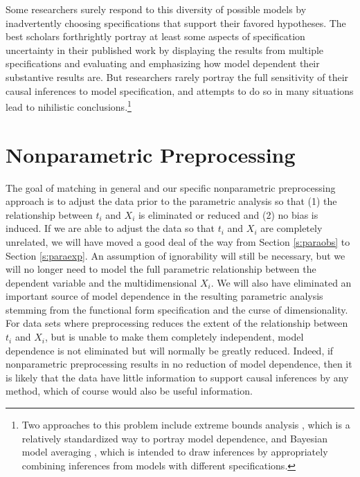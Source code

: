 \documentclass[11pt,titlepage]{article}
\begin{document}
Some researchers surely respond to this diversity of possible models
by inadvertently choosing specifications that support their favored
hypotheses.  The best scholars forthrightly portray at least some
aspects of specification uncertainty in their published work by
displaying the results from multiple specifications and evaluating and
emphasizing how model dependent their substantive results are.  But
researchers rarely portray the full sensitivity of their causal
inferences to model specification, and attempts to do so in many
situations lead to nihilistic conclusions.\footnote{Two approaches to
  this problem include extreme bounds analysis \citep{Leamer78}, which
  is a relatively standardized way to portray model dependence, and
  Bayesian model averaging \citep{HoeMadRaf99,ImaKin04}, which is
  intended to draw inferences by appropriately combining inferences
  from models with different specifications.}

\section{Nonparametric Preprocessing} \label{s:nonparpreproc}

The goal of matching in general and our specific nonparametric
preprocessing approach is to adjust the data prior to the parametric
analysis so that (1) the relationship between $t_i$ and $X_i$ is
eliminated or reduced and (2) no bias is induced.  If we are able to
adjust the data so that $t_i$ and $X_i$ are completely unrelated, we
will have moved a good deal of the way from Section \ref{s:paraobs} to
Section \ref{s:paraexp}.  An assumption of ignorability will still be
necessary, but we will no longer need to model the full parametric
relationship between the dependent variable and the multidimensional
$X_i$.  We will also have eliminated an important source of model
dependence in the resulting parametric analysis stemming from the
functional form specification and the curse of dimensionality.  For
data sets where preprocessing reduces the extent of the relationship
between $t_i$ and $X_i$, but is unable to make them completely
independent, model dependence is not eliminated but will normally be
greatly reduced.  Indeed, if nonparametric preprocessing results in no
reduction of model dependence, then it is likely that the data have
little information to support causal inferences by any method, which
of course would also be useful information.
\end{document}
